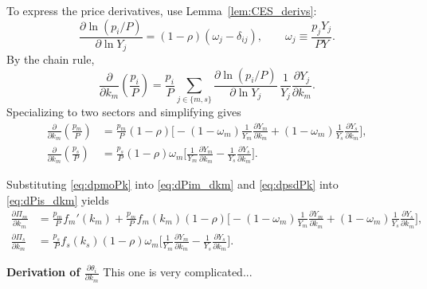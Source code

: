 \documentclass[12pt]{article} %
\theoremstyle{remark}
\begin{document}
\medskip

To express the price derivatives, use Lemma~\ref{lem:CES_derivs}:
\[
\frac{\partial \ln (p_i/P)}{\partial \ln Y_j}=(1-\rho)(\omega_j-\delta_{ij}),
\qquad \omega_j\equiv \frac{p_jY_j}{PY}.
\]
By the chain rule,
\[
\frac{\partial}{\partial k_m}\!\left(\frac{p_i}{P}\right)
=\frac{p_i}{P}\sum_{j\in\{m,s\}}\frac{\partial \ln (p_i/P)}{\partial \ln Y_j}\,
\frac{1}{Y_j}\frac{\partial Y_j}{\partial k_m}.
\]
Specializing to two sectors and simplifying gives
\begin{align}
\frac{\partial}{\partial k_m}\!\left(\frac{p_m}{P}\right)
&=\frac{p_m}{P}(1-\rho)\Bigg[
-(1-\omega_m)\frac{1}{Y_m}\frac{\partial Y_m}{\partial k_m}
+(1-\omega_m)\frac{1}{Y_s}\frac{\partial Y_s}{\partial k_m}
\Bigg],
\label{eq:dpmoPk}\\[0.4em]
\frac{\partial}{\partial k_m}\!\left(\frac{p_s}{P}\right)
&=\frac{p_s}{P}(1-\rho)\omega_m\Bigg[
\frac{1}{Y_m}\frac{\partial Y_m}{\partial k_m}
-\frac{1}{Y_s}\frac{\partial Y_s}{\partial k_m}
\Bigg].
\label{eq:dpsdPk}
\end{align}

Substituting \eqref{eq:dpmoPk} into \eqref{eq:dPim_dkm} and \eqref{eq:dpsdPk} into \eqref{eq:dPis_dkm} yields
\begin{align}
\frac{\partial \Pi_m}{\partial k_m}
&=
\frac{p_m}{P}f_m'(k_m)
+\frac{p_m}{P}f_m(k_m)(1-\rho)\Bigg[
-(1-\omega_m)\frac{1}{Y_m}\frac{\partial Y_m}{\partial k_m}
+(1-\omega_m)\frac{1}{Y_s}\frac{\partial Y_s}{\partial k_m}
\Bigg],
\label{eq:dPim_dkm_closed}\\[0.6em]
\frac{\partial \Pi_s}{\partial k_m}
&=
\frac{p_s}{P}f_s(k_s)(1-\rho)\omega_m\Bigg[
\frac{1}{Y_m}\frac{\partial Y_m}{\partial k_m}
-\frac{1}{Y_s}\frac{\partial Y_s}{\partial k_m}
\Bigg].
\label{eq:dPis_dkm_closed}
\end{align}

\textbf{Derivation of $\frac{\partial \theta_i}{\partial k_m}$}
This one is very complicated...
\end{document}
